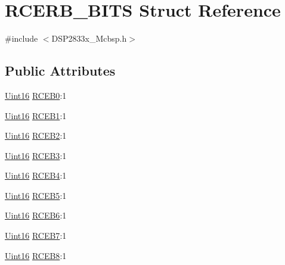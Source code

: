 \hypertarget{struct_r_c_e_r_b___b_i_t_s}{}\section{R\+C\+E\+R\+B\+\_\+\+B\+I\+T\+S Struct Reference}
\label{struct_r_c_e_r_b___b_i_t_s}


{\ttfamily \#include $<$D\+S\+P2833x\+\_\+\+Mcbsp.\+h$>$}

\subsection*{Public Attributes}
\begin{DoxyCompactItemize}
\item 
\hyperlink{_d_s_p2833x___device_8h_a59a9f6be4562c327cbfb4f7e8e18f08b}{Uint16} \hyperlink{struct_r_c_e_r_b___b_i_t_s_a6cf4b944d8b23346fdb17e39171a2c9a}{R\+C\+E\+B0}\+:1
\item 
\hyperlink{_d_s_p2833x___device_8h_a59a9f6be4562c327cbfb4f7e8e18f08b}{Uint16} \hyperlink{struct_r_c_e_r_b___b_i_t_s_aa67ace46a5a4a938b486aed4395a9fbb}{R\+C\+E\+B1}\+:1
\item 
\hyperlink{_d_s_p2833x___device_8h_a59a9f6be4562c327cbfb4f7e8e18f08b}{Uint16} \hyperlink{struct_r_c_e_r_b___b_i_t_s_aa52684c702000f5d7ef90482ebda9bf1}{R\+C\+E\+B2}\+:1
\item 
\hyperlink{_d_s_p2833x___device_8h_a59a9f6be4562c327cbfb4f7e8e18f08b}{Uint16} \hyperlink{struct_r_c_e_r_b___b_i_t_s_a57f3080f3e958a834cafd11dd2ed3fb7}{R\+C\+E\+B3}\+:1
\item 
\hyperlink{_d_s_p2833x___device_8h_a59a9f6be4562c327cbfb4f7e8e18f08b}{Uint16} \hyperlink{struct_r_c_e_r_b___b_i_t_s_acd4863a6f245dc914c9d933ce08226a9}{R\+C\+E\+B4}\+:1
\item 
\hyperlink{_d_s_p2833x___device_8h_a59a9f6be4562c327cbfb4f7e8e18f08b}{Uint16} \hyperlink{struct_r_c_e_r_b___b_i_t_s_a1384a8a882eb1f5d3f48f9510c6f6ce6}{R\+C\+E\+B5}\+:1
\item 
\hyperlink{_d_s_p2833x___device_8h_a59a9f6be4562c327cbfb4f7e8e18f08b}{Uint16} \hyperlink{struct_r_c_e_r_b___b_i_t_s_a7a3bd13264e0ff0439b6e52b2523de9b}{R\+C\+E\+B6}\+:1
\item 
\hyperlink{_d_s_p2833x___device_8h_a59a9f6be4562c327cbfb4f7e8e18f08b}{Uint16} \hyperlink{struct_r_c_e_r_b___b_i_t_s_afb2a9a64a0633976c60b83ff43e839b8}{R\+C\+E\+B7}\+:1
\item 
\hyperlink{_d_s_p2833x___device_8h_a59a9f6be4562c327cbfb4f7e8e18f08b}{Uint16} \hyperlink{struct_r_c_e_r_b___b_i_t_s_a6c4e1d664c4c2cc4234ef0fa56a8008e}{R\+C\+E\+B8}\+:1

\end{DoxyCompactItemize}
